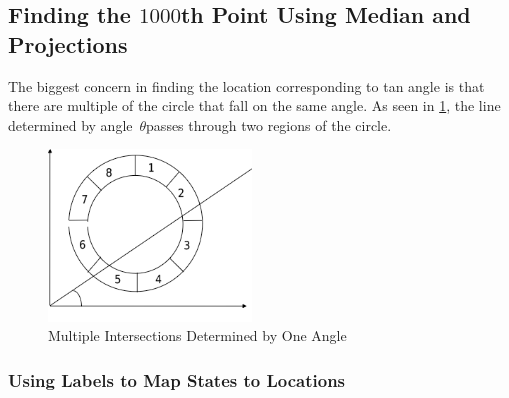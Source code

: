 \documentclass[twoside]{article}
\begin{document}
\subsection{Finding the $\num{1000}$th Point Using Median and Projections}\label{sec:find-num1000th-point}

The biggest concern in finding the location corresponding to tan angle is that there are multiple of the circle that fall on the same angle.
As seen in \cref{fig:multi-intersect}, the line determined by angle~$\theta$passes through two regions of the circle.
\begin{figure}
  \begin{center}
    \includegraphics[width=0.48\textwidth]{images/two-intersection}
    \caption[multi-intersect]{Multiple Intersections Determined by One Angle}\label{fig:multi-intersect}
  \end{center}
\end{figure}

\subsubsection{Using Labels to Map States to Locations}\label{sec:using-labels-map}
\end{document}
